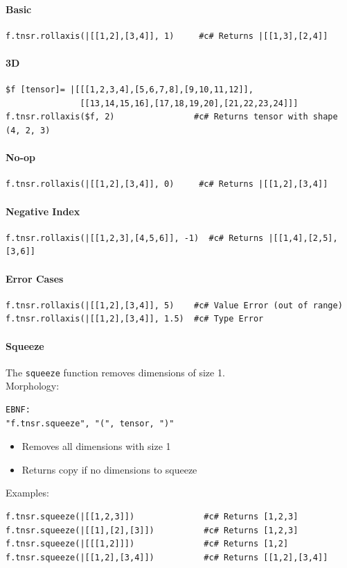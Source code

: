 \paragraph{Basic}
\begin{verbatim}
f.tnsr.rollaxis(|[[1,2],[3,4]], 1)     #c# Returns |[[1,3],[2,4]]
\end{verbatim}

\paragraph{3D}
\begin{verbatim}
$f [tensor]= |[[[1,2,3,4],[5,6,7,8],[9,10,11,12]],
               [[13,14,15,16],[17,18,19,20],[21,22,23,24]]]
f.tnsr.rollaxis($f, 2)                #c# Returns tensor with shape (4, 2, 3)
\end{verbatim}

\paragraph{No-op}
\begin{verbatim}
f.tnsr.rollaxis(|[[1,2],[3,4]], 0)     #c# Returns |[[1,2],[3,4]]
\end{verbatim}

\paragraph{Negative Index}
\begin{verbatim}
f.tnsr.rollaxis(|[[1,2,3],[4,5,6]], -1)  #c# Returns |[[1,4],[2,5],[3,6]]
\end{verbatim}

\paragraph{Error Cases}
\begin{verbatim}
f.tnsr.rollaxis(|[[1,2],[3,4]], 5)    #c# Value Error (out of range)
f.tnsr.rollaxis(|[[1,2],[3,4]], 1.5)  #c# Type Error
\end{verbatim}

\paragraph{Squeeze}
The \texttt{squeeze} function removes dimensions of size 1.\\
Morphology:
\begin{verbatim}
EBNF:
"f.tnsr.squeeze", "(", tensor, ")"
\end{verbatim}
\begin{itemize}
\item Removes all dimensions with size 1
\item Returns copy if no dimensions to squeeze
\end{itemize}
Examples:
\begin{verbatim}
f.tnsr.squeeze(|[[1,2,3]])              #c# Returns [1,2,3]
f.tnsr.squeeze(|[[1],[2],[3]])          #c# Returns [1,2,3]
f.tnsr.squeeze(|[[[1,2]]])              #c# Returns [1,2]
f.tnsr.squeeze(|[[1,2],[3,4]])          #c# Returns [[1,2],[3,4]]
\end{verbatim}

